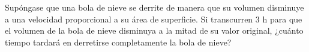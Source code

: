 \item Supóngase que una bola de nieve se derrite de manera que su volumen disminuye a una velocidad proporcional a su área de superficie. Si transcurren $3 \text{ h}$ para que el volumen de la bola de nieve disminuya a la mitad de su valor original, ¿cuánto tiempo tardará en derretirse completamente la bola de nieve?
